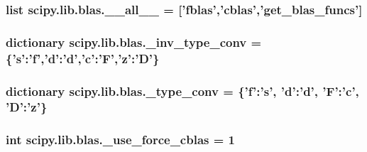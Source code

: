 \subsubsection[{\+\_\+\+\_\+all\+\_\+\+\_\+}]{\setlength{\rightskip}{0pt plus 5cm}list scipy.\+lib.\+blas.\+\_\+\+\_\+all\+\_\+\+\_\+ = \mbox{[}'{\bf fblas}','{\bf cblas}','{\bf get\+\_\+blas\+\_\+funcs}'\mbox{]}}\label{namespacescipy_1_1lib_1_1blas_a77b86f1a74caf75eaa8989a8dc26b135}
\hypertarget{namespacescipy_1_1lib_1_1blas_a47b1f81cd7b79943c15e0a88f7814a9b}{}
\subsubsection[{\+\_\+inv\+\_\+type\+\_\+conv}]{\setlength{\rightskip}{0pt plus 5cm}dictionary scipy.\+lib.\+blas.\+\_\+inv\+\_\+type\+\_\+conv = \{'{\bf s}'\+:'f','d'\+:'d','c'\+:'F','z'\+:'{\bf D}'\}}\label{namespacescipy_1_1lib_1_1blas_a47b1f81cd7b79943c15e0a88f7814a9b}
\hypertarget{namespacescipy_1_1lib_1_1blas_a31c884838b834922b61a9a316d2345ae}{}
\subsubsection[{\+\_\+type\+\_\+conv}]{\setlength{\rightskip}{0pt plus 5cm}dictionary scipy.\+lib.\+blas.\+\_\+type\+\_\+conv = \{'f'\+:'{\bf s}', 'd'\+:'d', 'F'\+:'c', '{\bf D}'\+:'z'\}}\label{namespacescipy_1_1lib_1_1blas_a31c884838b834922b61a9a316d2345ae}
\hypertarget{namespacescipy_1_1lib_1_1blas_a2e3e14899f9b784a8b934964ee5b3eb7}{}
\subsubsection[{\+\_\+use\+\_\+force\+\_\+cblas}]{\setlength{\rightskip}{0pt plus 5cm}int scipy.\+lib.\+blas.\+\_\+use\+\_\+force\+\_\+cblas = 1}\label{namespacescipy_1_1lib_1_1blas_a2e3e14899f9b784a8b934964ee5b3eb7}
\hypertarget{namespacescipy_1_1lib_1_1blas_a2fa2776dc97751a7ac274545e214a119}{}
